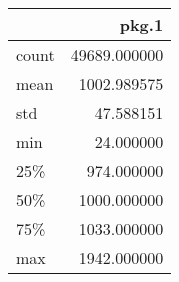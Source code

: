 \begin{tabular}{lr}
\toprule
{} &         pkg.1 \\
\midrule
count &  49689.000000 \\
mean  &   1002.989575 \\
std   &     47.588151 \\
min   &     24.000000 \\
25\%   &    974.000000 \\
50\%   &   1000.000000 \\
75\%   &   1033.000000 \\
max   &   1942.000000 \\
\bottomrule
\end{tabular}

